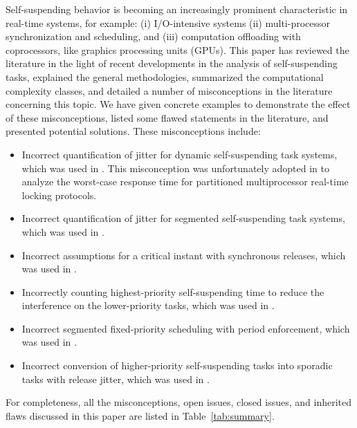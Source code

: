  Self-suspending behavior is becoming an increasingly prominent
characteristic in real-time systems, for example: (i) I/O-intensive systems
(ii) multi-processor synchronization and scheduling, and (iii)
computation offloading with coprocessors, like graphics processing
units (GPUs).  This paper has reviewed the literature in the light of
recent developments in the analysis of self-suspending tasks,
explained the general methodologies, summarized the computational complexity classes, 
and detailed a number of 
misconceptions in the literature concerning this topic. We
have given concrete examples to demonstrate the effect of these
misconceptions, listed some flawed statements in the literature, and
presented potential solutions. These misconceptions include:
\begin{itemize}
\item Incorrect quantification of jitter for dynamic self-suspending
  task systems, which was used in
  \cite{ECRTS-AudsleyB04,RTAS-AudsleyB04,RTCSA-KimCPKH95,MingLiRTCSA1994}.  This
  misconception was unfortunately adopted in
  \cite{zeng-2011,bbb-2013,yang-2013,kim-2014,han-2014,carminati-2014,yang-2014,lakshmanan-2009} to analyze the worst-case response time for
  partitioned multiprocessor real-time locking protocols.
\item Incorrect quantification of jitter for segmented self-suspending
  task systems, which was used in  \cite{RTCSA-BletsasA05}.
\item Incorrect assumptions for a critical instant with
  synchronous releases, which was used in \cite{LR:rtas10}.
\item Incorrectly counting highest-priority self-suspending time to reduce the
  interference on the lower-priority tasks, which was used in  \cite{RTSS-KimANR13}. 
\item Incorrect segmented fixed-priority scheduling with period
  enforcement, which was used in
  \cite{RTSS-KimANR13,DBLP:journals/ieicet/DingTT09}.
\item Incorrect conversion of higher-priority self-suspending tasks into sporadic tasks with release jitter, which was used in \cite{ecrts15nelissen}.
\end{itemize}
For completeness, all the misconceptions, open issues, closed issues,
and inherited flaws discussed in this paper are listed in Table~\ref{tab:summary}.

